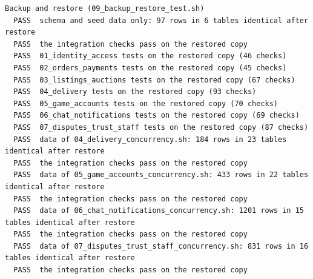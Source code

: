\documentclass[11pt,a4paper]{article}
\begin{document}
{\begin{verbatim}
Backup and restore (09_backup_restore_test.sh)
  PASS  schema and seed data only: 97 rows in 6 tables identical after restore
  PASS  the integration checks pass on the restored copy
  PASS  01_identity_access tests on the restored copy (46 checks)
  PASS  02_orders_payments tests on the restored copy (45 checks)
  PASS  03_listings_auctions tests on the restored copy (67 checks)
  PASS  04_delivery tests on the restored copy (93 checks)
  PASS  05_game_accounts tests on the restored copy (70 checks)
  PASS  06_chat_notifications tests on the restored copy (69 checks)
  PASS  07_disputes_trust_staff tests on the restored copy (87 checks)
  PASS  data of 04_delivery_concurrency.sh: 184 rows in 23 tables identical after restore
  PASS  the integration checks pass on the restored copy
  PASS  data of 05_game_accounts_concurrency.sh: 433 rows in 22 tables identical after restore
  PASS  the integration checks pass on the restored copy
  PASS  data of 06_chat_notifications_concurrency.sh: 1201 rows in 15 tables identical after restore
  PASS  the integration checks pass on the restored copy
  PASS  data of 07_disputes_trust_staff_concurrency.sh: 831 rows in 16 tables identical after restore
  PASS  the integration checks pass on the restored copy


\end{verbatim}}
\end{document}
